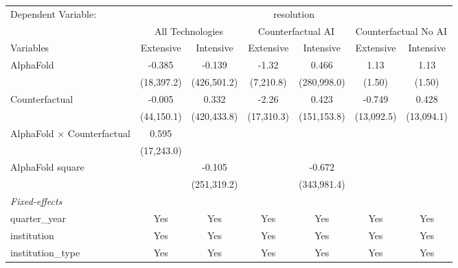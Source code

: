 \begingroup
\centering
\begin{tabular}{lcccccc}
   \tabularnewline \midrule \midrule
   Dependent Variable: & \multicolumn{6}{c}{resolution}\\
 & \multicolumn{2}{c}{All Technologies} & \multicolumn{2}{c}{Counterfactual AI} & \multicolumn{2}{c}{Counterfactual No AI} \\
\cmidrule(lr){1-1}\cmidrule(lr){2-3} \cmidrule(lr){4-5} \cmidrule(lr){6-7}
Variables & \multicolumn{1}{c}{Extensive} & \multicolumn{1}{c}{Intensive} & \multicolumn{1}{c}{Extensive} & \multicolumn{1}{c}{Intensive} & \multicolumn{1}{c}{Extensive} & \multicolumn{1}{c}{Intensive} \\
\cmidrule(lr){1-1}\cmidrule(lr){2-2} \cmidrule(lr){3-3} \cmidrule(lr){4-4} \cmidrule(lr){5-5} \cmidrule(lr){6-6} \cmidrule(lr){7-7}
   AlphaFold                          & -0.385     & -0.139      & -1.32      & 0.466       & 1.13       & 1.13\\   
                                      & (18,397.2) & (426,501.2) & (7,210.8)  & (280,998.0) & (1.50)     & (1.50)\\   
   Counterfactual                     & -0.005     & 0.332       & -2.26      & 0.423       & -0.749     & 0.428\\   
                                      & (44,150.1) & (420,433.8) & (17,310.3) & (151,153.8) & (13,092.5) & (13,094.1)\\   
   AlphaFold $\times$ Counterfactual  & 0.595      &             &            &             &            &   \\   
                                      & (17,243.0) &             &            &             &            &   \\   
   AlphaFold square                   &            & -0.105      &            & -0.672      &            &   \\   
                                      &            & (251,319.2) &            & (343,981.4) &            &   \\   
   \midrule
   \emph{Fixed-effects}\\
   quarter\_year                      & Yes        & Yes         & Yes        & Yes         & Yes        & Yes\\  
   institution                        & Yes        & Yes         & Yes        & Yes         & Yes        & Yes\\  
   institution\_type                  & Yes        & Yes         & Yes        & Yes         & Yes        & Yes\\  

\end{tabular}
